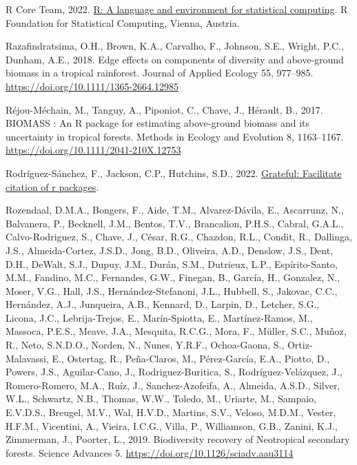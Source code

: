 \documentclass[
  12pt,
]{article}
\newlength{\cslhangindent}
\newlength{\cslentryspacingunit} %
\newenvironment{CSLReferences}[2] %
 {%
  \setlength{\parindent}{0pt}
  \ifodd #1
  \let\oldpar\par
  \def\par{\hangindent=\cslhangindent\oldpar}
  \fi
  \setlength{\parskip}{#2\cslentryspacingunit}
 }%
 {}
\begin{document}
\begin{CSLReferences}{1}{0}
\leavevmode{}%
R Core Team, 2022. \href{https://www.R-project.org/}{R: A language and environment for statistical computing}. R Foundation for Statistical Computing, Vienna, Austria.

\leavevmode{}%
Razafindratsima, O.H., Brown, K.A., Carvalho, F., Johnson, S.E., Wright, P.C., Dunham, A.E., 2018. Edge effects on components of diversity and above-ground biomass in a tropical rainforest. Journal of Applied Ecology 55, 977--985. \url{https://doi.org/10.1111/1365-2664.12985}

\leavevmode{}%
Réjou-Méchain, M., Tanguy, A., Piponiot, C., Chave, J., Hérault, B., 2017. {BIOMASS} : An {R} package for estimating above-ground biomass and its uncertainty in tropical forests. Methods in Ecology and Evolution 8, 1163--1167. \url{https://doi.org/10.1111/2041-210X.12753}

\leavevmode{}%
Rodríguez-Sánchez, F., Jackson, C.P., Hutchins, S.D., 2022. \href{https://github.com/Pakillo/grateful}{Grateful: Facilitate citation of r packages}.

\leavevmode{}%
Rozendaal, D.M.A., Bongers, F., Aide, T.M., Alvarez-Dávila, E., Ascarrunz, N., Balvanera, P., Becknell, J.M., Bentos, T.V., Brancalion, P.H.S., Cabral, G.A.L., Calvo-Rodriguez, S., Chave, J., César, R.G., Chazdon, R.L., Condit, R., Dallinga, J.S., Almeida-Cortez, J.S.D., Jong, B.D., Oliveira, A.D., Denslow, J.S., Dent, D.H., DeWalt, S.J., Dupuy, J.M., Durán, S.M., Dutrieux, L.P., Espírito-Santo, M.M., Fandino, M.C., Fernandes, G.W., Finegan, B., García, H., Gonzalez, N., Moser, V.G., Hall, J.S., Hernández-Stefanoni, J.L., Hubbell, S., Jakovac, C.C., Hernández, A.J., Junqueira, A.B., Kennard, D., Larpin, D., Letcher, S.G., Licona, J.C., Lebrija-Trejos, E., Marín-Spiotta, E., Martínez-Ramos, M., Massoca, P.E.S., Meave, J.A., Mesquita, R.C.G., Mora, F., Müller, S.C., Muñoz, R., Neto, S.N.D.O., Norden, N., Nunes, Y.R.F., Ochoa-Gaona, S., Ortiz-Malavassi, E., Ostertag, R., Peña-Claros, M., Pérez-García, E.A., Piotto, D., Powers, J.S., Aguilar-Cano, J., Rodriguez-Buritica, S., Rodríguez-Velázquez, J., Romero-Romero, M.A., Ruíz, J., Sanchez-Azofeifa, A., Almeida, A.S.D., Silver, W.L., Schwartz, N.B., Thomas, W.W., Toledo, M., Uriarte, M., Sampaio, E.V.D.S., Breugel, M.V., Wal, H.V.D., Martins, S.V., Veloso, M.D.M., Vester, H.F.M., Vicentini, A., Vieira, I.C.G., Villa, P., Williamson, G.B., Zanini, K.J., Zimmerman, J., Poorter, L., 2019. Biodiversity recovery of {Neotropical} secondary forests. Science Advances 5. \url{https://doi.org/10.1126/sciadv.aau3114}


\end{CSLReferences}
\end{document}
